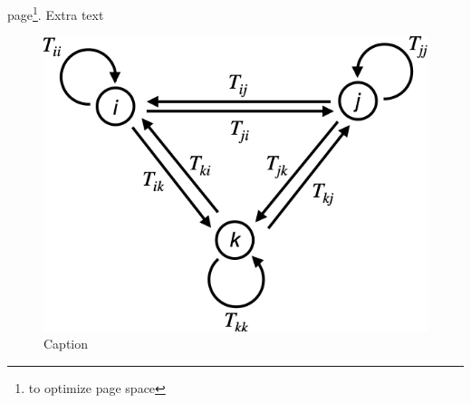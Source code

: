 \blindtext
page\footnote{to optimize page space}. Extra text \cite{reed07}

\begin{figure}
    \centering
    \includegraphics[scale=0.5]{figures/graph.png}
    \caption{Caption}
    \label{fig:my_label}
\end{figure}